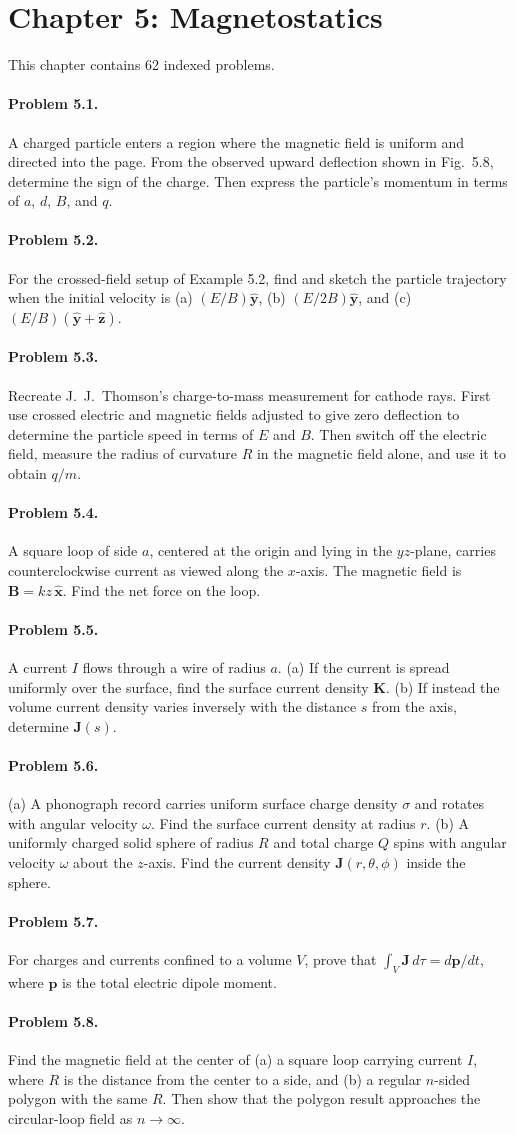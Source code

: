 \documentclass{aa}
\newcommand{\problemstatement}[2]{%
\paragraph{Problem #1.}#2\par\medskip
}
\begin{document}
\section{Chapter 5: Magnetostatics}
This chapter contains 62 indexed problems.

\problemstatement{5.1}{A charged particle enters a region where the magnetic field is uniform and directed into the page. From the observed upward deflection shown in Fig.~5.8, determine the sign of the charge. Then express the particle's momentum in terms of \(a\), \(d\), \(B\), and \(q\).}
\problemstatement{5.2}{For the crossed-field setup of Example 5.2, find and sketch the particle trajectory when the initial velocity is (a) \((E/B)\hat{\mathbf y}\), (b) \((E/2B)\hat{\mathbf y}\), and (c) \((E/B)(\hat{\mathbf y}+\hat{\mathbf z})\).}
\problemstatement{5.3}{Recreate J.~J.~Thomson's charge-to-mass measurement for cathode rays. First use crossed electric and magnetic fields adjusted to give zero deflection to determine the particle speed in terms of \(E\) and \(B\). Then switch off the electric field, measure the radius of curvature \(R\) in the magnetic field alone, and use it to obtain \(q/m\).}
\problemstatement{5.4}{A square loop of side \(a\), centered at the origin and lying in the \(yz\)-plane, carries counterclockwise current as viewed along the \(x\)-axis. The magnetic field is \(\mathbf B = kz\,\hat{\mathbf x}\). Find the net force on the loop.}
\problemstatement{5.5}{A current \(I\) flows through a wire of radius \(a\). (a) If the current is spread uniformly over the surface, find the surface current density \(\mathbf K\). (b) If instead the volume current density varies inversely with the distance \(s\) from the axis, determine \(\mathbf J(s)\).}
\problemstatement{5.6}{(a) A phonograph record carries uniform surface charge density \(\sigma\) and rotates with angular velocity \(\omega\). Find the surface current density at radius \(r\). (b) A uniformly charged solid sphere of radius \(R\) and total charge \(Q\) spins with angular velocity \(\omega\) about the \(z\)-axis. Find the current density \(\mathbf J(r,\theta,\phi)\) inside the sphere.}
\problemstatement{5.7}{For charges and currents confined to a volume \(V\), prove that \(\int_V \mathbf J\,d\tau = d\mathbf p/dt\), where \(\mathbf p\) is the total electric dipole moment.}
\problemstatement{5.8}{Find the magnetic field at the center of (a) a square loop carrying current \(I\), where \(R\) is the distance from the center to a side, and (b) a regular \(n\)-sided polygon with the same \(R\). Then show that the polygon result approaches the circular-loop field as \(n\to\infty\).}
\end{document}
